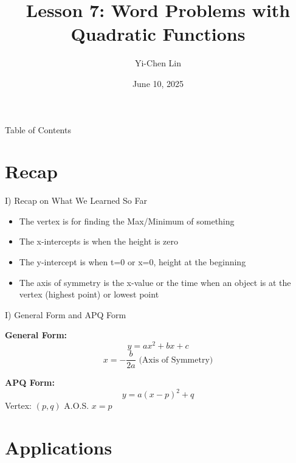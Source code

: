 \documentclass[aspectratio=169]{beamer}
\title{Lesson 7: Word Problems with Quadratic Functions}
\author{Yi-Chen Lin}
\date{June 10, 2025}
\begin{document}
\begin{frame}
    \titlepage
\end{frame}

\begin{frame}{Table of Contents}
    \tableofcontents
\end{frame}

\section{Recap}

\begin{frame}{I) Recap on What We Learned So Far}
    \begin{tcolorbox}[colback=lightgray,colframe=primary,title=Key Concepts]
        \footnotesize
        \begin{itemize}
            \item The vertex is for finding the Max/Minimum of something
            \item The x-intercepts is when the height is zero
            \item The y-intercept is when t=0 or x=0, height at the beginning
            \item The axis of symmetry is the x-value or the time when an object is at the vertex (highest point) or lowest point
        \end{itemize}
    \end{tcolorbox}
\end{frame}

\begin{frame}{I) General Form and APQ Form}
    \begin{tcolorbox}[colback=lightgray,colframe=primary,title=Forms]
        \footnotesize
        \textbf{General Form:}
        \[y = ax^2 + bx + c\]
        \[x = -\frac{b}{2a} \text{ (Axis of Symmetry)}\]
        
        \textbf{APQ Form:}
        \[y = a(x-p)^2 + q\]
        Vertex: $(p,q)$
        A.O.S. $x = p$
    \end{tcolorbox}
\end{frame}

\section{Applications}
\end{document}
